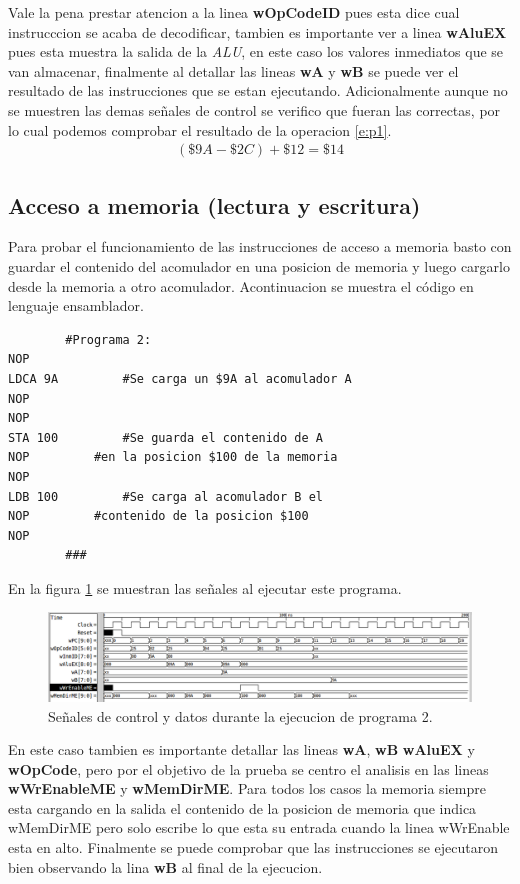 \documentclass[paper=letter, fontsize=12pt]{article}
\begin{document}
Vale la pena prestar atencion a la linea \textbf{wOpCodeID} pues esta dice cual instrucccion se acaba de decodificar, tambien es importante ver a linea \textbf{wAluEX} pues esta muestra la salida de la \textit{ALU}, en este caso los valores inmediatos que se van almacenar, finalmente al detallar las lineas \textbf{wA} y \textbf{wB} se puede ver el resultado de las instrucciones que se estan ejecutando. Adicionalmente aunque no se muestren las demas señales de control se verifico que fueran las correctas, por lo cual podemos comprobar el resultado de la operacion \ref{e:p1}.\\

\begin{align} 
\label{e:p1}
(\$9A - \$2C) + \$12 = \$14
\end{align}

\subsection{Acceso a memoria (lectura y escritura)}

Para probar el funcionamiento de las instrucciones de acceso a memoria basto con guardar el contenido del acomulador en una posicion de memoria y luego cargarlo desde la memoria a otro acomulador. Acontinuacion se muestra el código en lenguaje ensamblador.

\begin{lstlisting}
		#Programa 2:
NOP
LDCA 9A			#Se carga un $9A al acomulador A
NOP
NOP
STA 100			#Se guarda el contenido de A 
NOP			#en la posicion $100 de la memoria
NOP
LDB 100			#Se carga al acomulador B el 
NOP			#contenido de la posicion $100
NOP
		###
\end{lstlisting}

En la figura \ref{i:p2} se muestran las señales al ejecutar este programa.\\

\begin{figure}[hbtp]
\centering
\includegraphics[width=1\linewidth]{../test/Prog2.png}
\caption{Señales de control y datos durante la ejecucion de programa 2.}
\label{i:p2}
\end{figure}

En este caso tambien es importante detallar las lineas \textbf{wA}, \textbf{wB} \textbf{wAluEX} y \textbf{wOpCode}, pero por el objetivo de la prueba se centro el analisis en las lineas \textbf{wWrEnableME} y \textbf{wMemDirME}. Para todos los casos la memoria siempre esta cargando en la salida el contenido de la posicion de memoria que indica wMemDirME pero solo escribe lo que esta su entrada cuando la linea wWrEnable esta en alto. Finalmente se puede comprobar que las instrucciones se ejecutaron bien observando la lina \textbf{wB} al final de la ejecucion.
\end{document}
